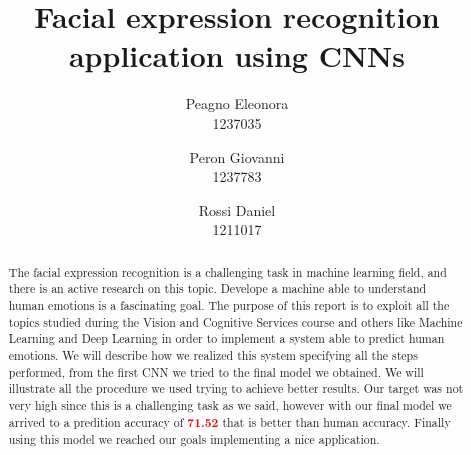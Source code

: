 \documentclass[10pt,twocolumn,letterpaper]{article}
\begin{document}
\title{Facial expression recognition application using CNNs}

\author{
   Peagno Eleonora \\\normalsize 1237035\\
   \and
   Peron Giovanni \\\normalsize 1237783\\
   \and
   Rossi Daniel \\\normalsize 1211017\\
}

\maketitle

\begin{abstract}
   The facial expression recognition is a challenging task in machine learning field, and there is an active research on this topic. Develope a machine able to understand human emotions is a fascinating goal. The purpose of this report is to exploit all the topics studied during the Vision and Cognitive Services course and others like Machine Learning and Deep Learning in order to implement a system able to predict human emotions. We will describe how we realized this system specifying all the steps performed, from the first CNN we tried to the final model we obtained. We will illustrate all the procedure we used trying to achieve better results. Our target was not very high since this is a challenging task as we said, however with our final model we arrived to a predition accuracy of \textbf{\textcolor{red}{71.52}} that is better than human accuracy. Finally using this model we reached our goals implementing a nice application.
\end{abstract}
\end{document}
